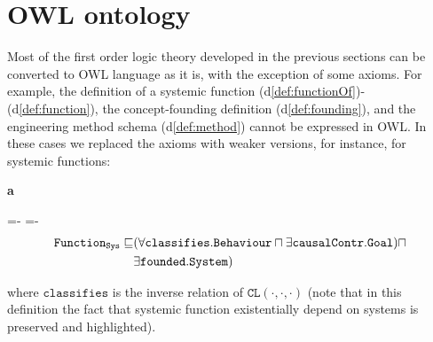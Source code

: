 \documentclass[sw]{iosart2x}
\newcommand{\bflist}{\begin{list}{}{\setlength{\topsep}{2mm}\setlength{\partopsep}{0mm}\setlength{\parsep}{0mm}\setlength{\leftmargin}{9mm}\setlength{\labelwidth}{8mm}}}
\newcommand{\eflist}{\end{list}}
\newcommand{\AxLabel}{\textrm{a}}
\newcommand{\DefLabel}{\textrm{d}}
\newcounter{cntax}
\newcommand{\myax}[1]{\refstepcounter{cntax}\begin{small}{\bf \AxLabel\thecntax\label{ax:#1}}\end{small}}
\newcommand{\refdf}[1]{({\DefLabel}\ref{#1})}
\newcommand{\generalStyle}[1]{\texttt{#1}}
\newcommand{\triRel}[4]{\generalStyle{#1}(#2,#3,#4)}
\newcommand{\OWL}{\textnormal{OWL}\xspace}
\newcommand{\DOLCECLby}[3]{\triRel{CL}{#1}{#2}{#3}}
\newcommand{\BehaviourConcreteNullary}{\generalStyle{Behaviour}}
\newcommand{\GoalNullary}{\generalStyle{Goal}}
\newcommand{\SystemNullary}{\generalStyle{System}}
\newcommand{\FunctionSysNullary}{\generalStyle{Function}_{\generalStyle{Sys}}}
\newcommand{\foundedNullary}{\generalStyle{\foundedTerm{passive}}}
\newcommand{\causallyContrNullary}{\generalStyle{causalContr}}
\newcommand{\foundedTerm}[1]{%
  \ifthenelse{\equal{#1}{passive}}{founded}{%
    \ifthenelse{\equal{#1}{verb}}{found}{%
      \ifthenelse{\equal{#1}{gerund}}{founding}{%
        ERROR!%
      }%
    }%
  }%
}
\newcommand{\myalignspaceskip}{
 \abovedisplayskip=-\baselineskip
 \belowdisplayskip=0pt
 \abovedisplayshortskip=-\baselineskip
 \belowdisplayshortskip=0pt}
\newcommand{\TODO}[1]{{\color{red} #1}}
\newcommand{\myComment}[1]{}
\begin{document}

\section{OWL ontology}\label{sec:appendice}
\TODO{%
\myComment{screenshot tipo e.g. \ref{fig:screen_query} \ref{fig:screen_entities}; %
query SPARQL%
.}
}
Most of the first order logic theory developed in the previous sections can be converted to \OWL language as it is, with the exception of some axioms.
For example, the definition of a systemic function \refdf{def:functionOf}-\refdf{def:function}, the concept-founding definition \refdf{def:founding}, and the engineering method schema \refdf{def:method} cannot be expressed in \OWL. 
In these cases we replaced the axioms with weaker versions, for instance, for systemic functions:
\bflist
\item[\myax{functionOWL}] 
\myalignspaceskip
\setlength{\jot}{0pt}%
\begin{align*}
    \FunctionSysNullary\sqsubseteq &
    (\forall\mathtt{classifies}.\BehaviourConcreteNullary \sqcap \exists\causallyContrNullary.\GoalNullary) 
        \sqcap \\ & \exists\foundedNullary.\SystemNullary)
\end{align*}
\eflist
where $\mathtt{classifies}$ is the inverse relation of $\DOLCECLby{\cdot}{\cdot}{\cdot}$ (note that in this definition the fact that systemic function existentially depend on systems is preserved and highlighted).

\end{document}
